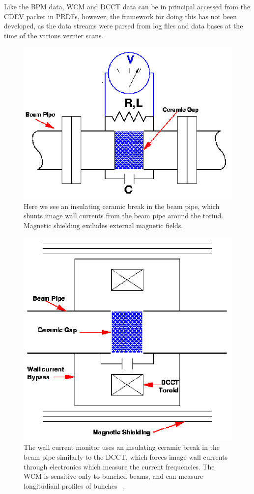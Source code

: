 Like the BPM data, WCM and DCCT data can be in principal accessed from the CDEV
packet in PRDFs, however, the framework for doing this has not been developed,
as the data streams were parsed from log files and data bases at the time of the
various vernier scans.

\begin{figure}[ht]
  \begin{center}
    \includegraphics[width=0.75\linewidth]{./figures/wcm_schematic_cartoon}
    \caption{ 
      Here we see an insulating ceramic break in the beam pipe, which shunts
      image wall currents from the beam pipe around the toriud. Magnetic
      shielding excludes external magnetic fields.~\cite{kawallfocus2005} 
    }
    \label{fig:wcm_schematic_cartoon}
  \end{center}
\end{figure}

\begin{figure}[ht]
  \begin{center}
    \includegraphics[width=0.75\linewidth]{./figures/dcct_schematic_cartoon}
    \caption{
      The wall current monitor uses an insulating ceramic break in the beam pipe
      similarly to the DCCT, which forces image wall currents through
      electronics which measure the current frequencies. The WCM is sensitive
      only to bunched beams, and can measure longitudianl profiles of bunches
      ~\cite{kawallfocus2005}.
    }
    \label{fig:dcct_schematic_cartoon}
  \end{center}
\end{figure}


